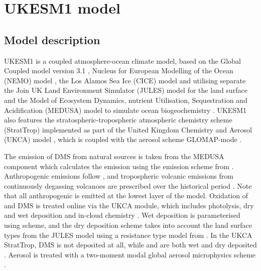 \section{UKESM1 model}  
\label{sec:1.ukesm1}

\subsection{Model description}
UKESM1 is a coupled atmosphere-ocean climate model, based on the Global Coupled model version 3.1 \citep[HadGEM3-GC3.1;][]{kuhlbrodtLowResolutionVersionHadGEM32018, brownUnifiedModelingPrediction2012}, Nucleus for European Modelling of the Ocean (NEMO) model \citep{storkeyUKGlobalOcean2018}, the Los Alamos Sea Ice (CICE) model \citep{ridleySeaIceModel2018} and utilising separate the Join UK Land Environment Simulator (JULES) model for the land surface \citep{bestJointUKLand2011} and the Model of Ecosystem Dynamics, nutrient Utilisation, Sequestration and Acidification (MEDUSA) model to simulate ocean biogeochemistry \citep{yoolMEDUSA2IntermediateComplexity2013}. UKESM1 also features the stratospheric-tropospheric atmospheric chemistry scheme (StratTrop) implemented as part of the United Kingdom Chemistry and Aerosol (UKCA) model \citep{archibaldDescriptionEvaluationUKCA2020}, which is coupled with the aerosol scheme GLOMAP-mode \citep{mulcahyDescriptionEvaluationAerosol2020}. 


The emission of DMS from natural sources is taken from the MEDUSA component which calculates the emission using the emission scheme from \citet{lissAirSeaGasExchange1986}. Anthropogenic  emissions follow \citet{hoeslyHistorical175020142018}, and tropospheric volcanic emissions from continuously degassing volcanoes are prescribed over the historical period \citep{andresTimeaveragedInventorySubaerial1998, dentenerEmissionsPrimaryAerosol2006}.  Note that all anthropogenic  is emitted at the lowest layer of the model. Oxidation of  and DMS is treated online via the UKCA module, which includes photolysis, dry and wet deposition and in-cloud chemistry \citep{mulcahyDescriptionEvaluationAerosol2020}. Wet deposition is parameterised using \citet{giannakopoulosValidationIntercomparisonWet1999} scheme, and the dry deposition scheme takes into account the land surface types from the JULES model using a resistance type model from \citet{weselyParameterizationSurfaceResistances1989}. In the UKCA StratTrop, DMS is not deposited at all, while  and  are both wet and dry deposited \citep{archibaldDescriptionEvaluationUKCA2020}. Aerosol is treated with a two-moment modal global aerosol microphysics scheme \citep[GLOMAP-mode;][]{mannDescriptionEvaluationGLOMAPmode2010}. 

